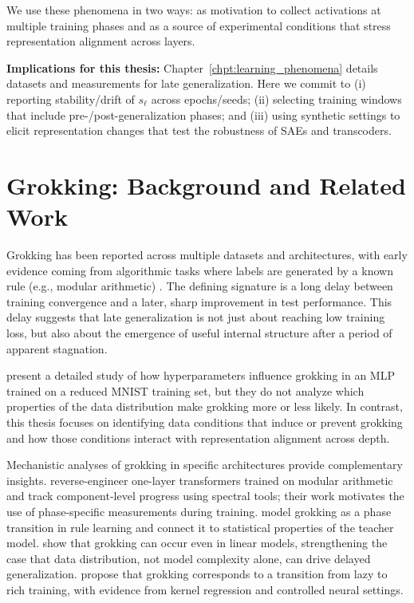 \documentclass[../ppgc-tese.tex]{subfiles}
\begin{document}
We use these phenomena in two ways: as motivation to collect activations at multiple training phases and as a source of experimental conditions that stress representation alignment across layers.

\textbf{Implications for this thesis:} Chapter~\ref{chpt:learning_phenomena} details datasets and measurements for late generalization. Here we commit to (i) reporting stability/drift of $s_\ell$ across epochs/seeds; (ii) selecting training windows that include pre-/post-generalization phases; and (iii) using synthetic settings to elicit representation changes that test the robustness of SAEs and transcoders.

\section{Grokking: Background and Related Work}
Grokking has been reported across multiple datasets and architectures, with early evidence coming from algorithmic tasks where labels are generated by a known rule (e.g., modular arithmetic) \cite{Grokking}. The defining signature is a long delay between training convergence and a later, sharp improvement in test performance. This delay suggests that late generalization is not just about reaching low training loss, but also about the emergence of useful internal structure after a period of apparent stagnation.

 present a detailed study of how hyperparameters influence grokking in an MLP trained on a reduced MNIST training set, but they do not analyze which properties of the data distribution make grokking more or less likely. In contrast, this thesis focuses on identifying data conditions that induce or prevent grokking and how those conditions interact with representation alignment across depth.

Mechanistic analyses of grokking in specific architectures provide complementary insights.  reverse-engineer one-layer transformers trained on modular arithmetic and track component-level progress using spectral tools; their work motivates the use of phase-specific measurements during training.  model grokking as a phase transition in rule learning and connect it to statistical properties of the teacher model.  show that grokking can occur even in linear models, strengthening the case that data distribution, not model complexity alone, can drive delayed generalization.  propose that grokking corresponds to a transition from lazy to rich training, with evidence from kernel regression and controlled neural settings.
\end{document}
